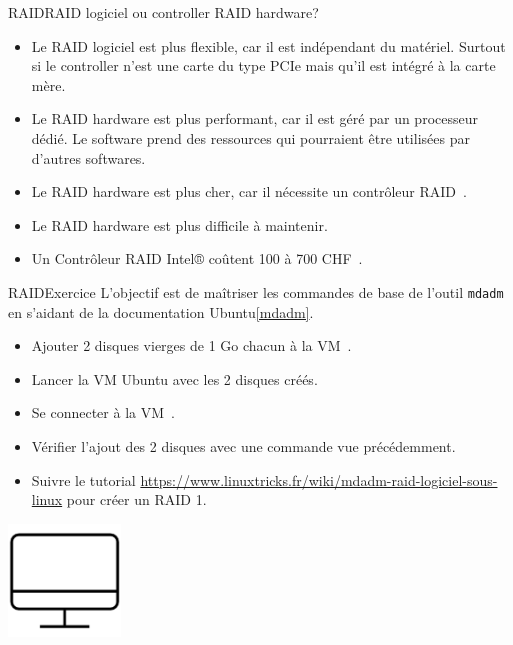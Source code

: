 \documentclass{beamer}
\begin{document}
    \begin{frame}{RAID}{RAID logiciel ou controller RAID hardware?}
        \begin{itemize}
            \item Le RAID logiciel est plus flexible, car il est indépendant du matériel.
            Surtout si le controller n'est une carte du type PCIe mais qu'il est intégré à la carte mère.
            \item Le RAID hardware est plus performant, car il est géré par un processeur dédié.
            Le software prend des ressources qui pourraient être utilisées par d'autres softwares.
            \item Le RAID hardware est plus cher, car il nécessite un contrôleur RAID~.
            \item Le RAID hardware est plus difficile à maintenir.
            \item Un Contrôleur RAID Intel® coûtent 100 à 700 CHF~.
        \end{itemize}
    \end{frame}

    \begin{frame}{RAID}{Exercice \execcounterdispinc{}}
        L'objectif est de maîtriser les commandes de base de l'outil \lstinline{mdadm} en s'aidant de la documentation Ubuntu\cref{mdadm}.
        \begin{itemize}
            \item Ajouter 2 disques vierges de 1 Go chacun à la VM~.
            \item Lancer la VM Ubuntu avec les 2 disques créés.
            \item Se connecter à la VM~.
            \item Vérifier l'ajout des 2 disques avec une commande vue précédemment.
            \item Suivre le tutorial \url{https://www.linuxtricks.fr/wiki/mdadm-raid-logiciel-sous-linux} pour créer un RAID 1.
        \end{itemize}
        \bigbreak
        \centering
        \includegraphics[width=3cm]{image/desktop}
    \end{frame}
\end{document}
